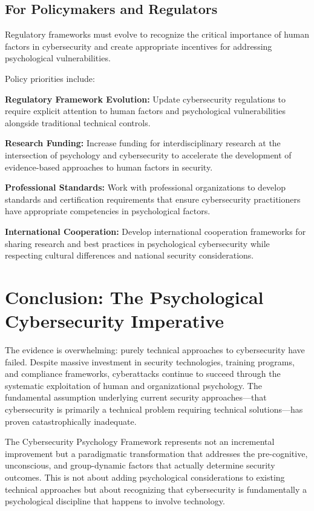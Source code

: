 \documentclass[10pt, twocolumn]{article}
\begin{document}
\subsection{For Policymakers and Regulators}

Regulatory frameworks must evolve to recognize the critical importance of human factors in cybersecurity and create appropriate incentives for addressing psychological vulnerabilities.

Policy priorities include:

\textbf{Regulatory Framework Evolution:} Update cybersecurity regulations to require explicit attention to human factors and psychological vulnerabilities alongside traditional technical controls.

\textbf{Research Funding:} Increase funding for interdisciplinary research at the intersection of psychology and cybersecurity to accelerate the development of evidence-based approaches to human factors in security.

\textbf{Professional Standards:} Work with professional organizations to develop standards and certification requirements that ensure cybersecurity practitioners have appropriate competencies in psychological factors.

\textbf{International Cooperation:} Develop international cooperation frameworks for sharing research and best practices in psychological cybersecurity while respecting cultural differences and national security considerations.

\section{Conclusion: The Psychological Cybersecurity Imperative}

The evidence is overwhelming: purely technical approaches to cybersecurity have failed. Despite massive investment in security technologies, training programs, and compliance frameworks, cyberattacks continue to succeed through the systematic exploitation of human and organizational psychology. The fundamental assumption underlying current security approaches—that cybersecurity is primarily a technical problem requiring technical solutions—has proven catastrophically inadequate.

The Cybersecurity Psychology Framework represents not an incremental improvement but a paradigmatic transformation that addresses the pre-cognitive, unconscious, and group-dynamic factors that actually determine security outcomes. This is not about adding psychological considerations to existing technical approaches but about recognizing that cybersecurity is fundamentally a psychological discipline that happens to involve technology.
\end{document}
